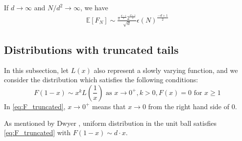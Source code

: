 \documentclass{aptpub}
\def\E{\mathbb{E}}
\begin{document}
 If $d\to\infty$ and $N/d^2\to \infty$, we have
\begin{align}\label{eq:d_infty_exp_E_F_N}
      \E[F_N]\sim \frac{\pi^{\frac{d-1}{2}} 2^{\frac{d+1}{2}}}{\sqrt{d}} \epsilon(N)^{\frac{-d+1}{2}}
\end{align}
\subsection{Distributions with truncated tails}
In this subsection, let $L(x)$ also represent a slowly varying function, and we consider the distribution which satisfies
the following conditions:
\begin{equation}\label{eq:F_truncated}
     F(1-x) \sim x^k L\left(\frac{1}{x} \right)  \text{ as } x \to 0^+, k> 0,
     F(x) = 0 \text{ for } x \geq 1
\end{equation}
In \eqref{eq:F_truncated}, $x \to 0^+$ means that $x\to 0$ from the right hand side of $0$.

As mentioned by Dwyer \cite{dwyer1991convex}, uniform distribution
in the unit ball satisfies \eqref{eq:F_truncated} with
$F(1-x) \sim d\cdot x$.
\end{document}

